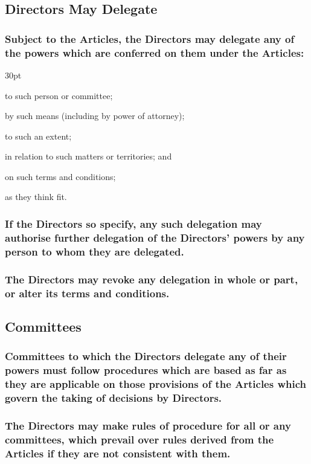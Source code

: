 \documentclass[12pt]{article}
\def\clauseindent{30pt}
\newenvironment{subindentpara}{\raggedright\begin{adjustwidth}{\clauseindent}{}\begin{hanginglist}}{\end{hanginglist}\end{adjustwidth}}
\begin{document}
\subsection{Directors May Delegate}
\subsubsection[Specifics of Directors' delegation]{Subject to the Articles, the Directors may delegate any of the powers which are conferred on them under the Articles:}
\begin{subindentpara}
    \item to such person or committee;
    \item by such means (including by power of attorney);
    \item to such an extent;
    \item in relation to such matters or territories; and
    \item on such terms and conditions;
    \item as they think fit.
\end{subindentpara}
\subsubsection[Delegation may be extended]{If the Directors so specify, any such delegation may authorise further delegation of the Directors' powers by any person to whom they are delegated.}
\subsubsection[Delegation may be revoked or modified]{The Directors may revoke any delegation in whole or part, or alter its terms and conditions.}

\subsection{Committees}
\subsubsection[Committees must comply with procedures]{Committees to which the Directors delegate any of their powers must follow procedures which are based as far as they are applicable on those provisions of the Articles which govern the taking of decisions by Directors.}
\subsubsection[Rules of procedure prevail]{The Directors may make rules of procedure for all or any committees, which prevail over rules derived from the Articles if they are not consistent with them.}
\end{document}
